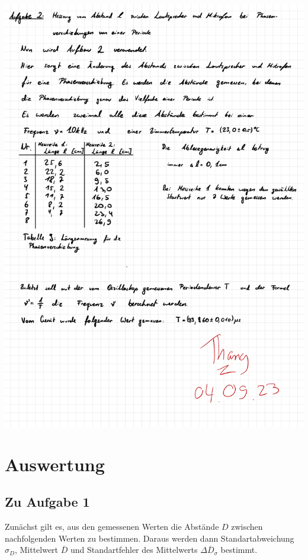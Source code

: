 \documentclass{article}
\begin{document}
\includegraphics[width=\textwidth]{graphics/mess5.jpg}
\newpage

\addtocounter{table}{9}

\newpage

\section{Auswertung}

\subsection{Zu Aufgabe 1}

Zunächst gilt es, aus den gemessenen Werten die Abstände $D$ zwischen nachfolgenden Werten zu bestimmen. Daraus werden dann Standartabweichung $\sigma_D$, Mittelwert $\overline{D}$ und Standartfehler des Mittelwerts $\Delta \overline{D}_{\sigma}$ bestimmt. 
\end{document}
